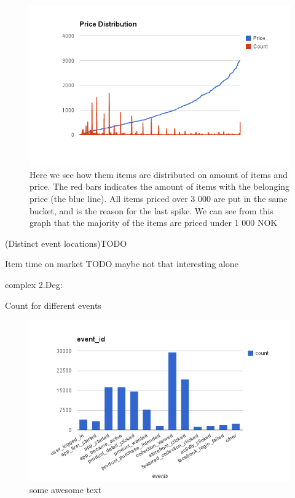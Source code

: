     \begin{figure}[H]
        \includegraphics[width=5in]{image/price_distr.png}
        \centering
        \caption[Price distribution of items]{Here we see how them items are distributed on amount of items and price. The red bars indicates the amount of items with the belonging price (the blue line).
        All items priced over 3 000 are put in the same bucket, and is the reason for the last spike.
        We can see from this graph that the majority of the items are priced under 1 000 NOK}
        \label{figure:ratingdistr}
    \end{figure}

            (Distinct event locations)TODO

            Item time on market TODO maybe not that interesting alone


        complex 2.Deg:

            Count for different events

    \begin{figure}[H]
        \includegraphics[width=5in]{image/event_id.png}
        \centering
        \caption[Count for different events]{some awesome text}
    \end{figure}

